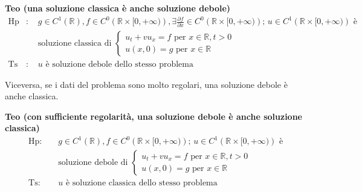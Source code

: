 \documentclass{article}
\begin{document}
\textbf{Teo (una soluzione classica \`{e} anche soluzione debole)}%
\begin{eqnarray*}
\text{Hp} &\text{: }&g\in C^{1}\left( 
\mathbb{R}
\right) ,f\in C^{0}\left( 
\mathbb{R}
\times \lbrack 0,+\infty )\right) ,\exists \frac{\partial f}{\partial x}\in
C^{0}\left( 
\mathbb{R}
\times \lbrack 0,+\infty )\right) \text{; }u\in C^{1}\left( 
\mathbb{R}
\times \lbrack 0,+\infty )\right) \text{ \`{e} } \\
&&\text{soluzione classica di }\left\{ 
\begin{array}{c}
u_{t}+vu_{x}=f\text{ per }x\in 
\mathbb{R}
,t>0 \\ 
u\left( x,0\right) =g\text{ per }x\in 
\mathbb{R}%
\end{array}%
\right. \\
\text{Ts} &\text{: }&u\text{ \`{e} soluzione debole dello stesso problema}
\end{eqnarray*}

Viceversa, se i dati del problema sono molto regolari, una soluzione debole 
\`{e} anche classica.

\textbf{Teo (con sufficiente regolarit\`{a}, una soluzione debole \`{e}
anche soluzione classica)}%
\begin{eqnarray*}
\text{Hp}\text{: } &&g\in C^{1}\left( 
\mathbb{R}
\right) ,f\in C^{0}\left( 
\mathbb{R}
\times \lbrack 0,+\infty )\right) \text{; }u\in C^{1}\left( 
\mathbb{R}
\times \lbrack 0,+\infty )\right) \text{ \`{e} } \\
&&\text{soluzione debole di }\left\{ 
\begin{array}{c}
u_{t}+vu_{x}=f\text{ per }x\in 
\mathbb{R}
,t>0 \\ 
u\left( x,0\right) =g\text{ per }x\in 
\mathbb{R}%
\end{array}%
\right. \\
\text{Ts}\text{: } &&u\text{ \`{e} soluzione classica dello stesso problema}
\end{eqnarray*}
\end{document}
